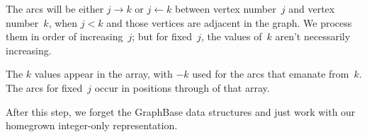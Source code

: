 The arcs will be either $j\to k$ or $j\gets
k$ between vertex number~$j$
and vertex number~$k$, when $j<k$ and those vertices are adjacent in
the graph. We process them in order of increasing~$j$; but for fixed~$j$,
the values of~$k$ aren't necessarily increasing.

The $k$ values appear in the  array, with $-k$ used for the arcs
that emanate from~$k$. The arcs for fixed~$j$
occur in positions  through  of that array.

After this step, we forget the GraphBase data structures and just work
with our homegrown integer-only representation.

